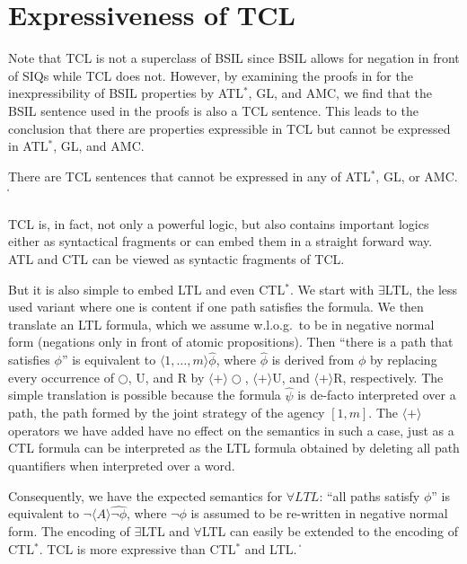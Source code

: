 \documentclass{llncs}
\newcommand{\until}{\textrm{U}} %
\newcommand{\rmrel}{\textrm{R}} %
\newcommand{\nxt}{\bigcirc}
\def\qed{\ifmmode\|\else{\unskip\nobreak\hfil
\penalty50\hskip1em\null\nobreak\hfil$\blacksquare$
\parfillskip=0pt\finalhyphendemerits=0\endgraf}\fi}
\begin{document}
\section{Expressiveness of TCL \label{sec.exp}}

Note that TCL is not a superclass of BSIL since 
BSIL allows for negation in front of SIQs while TCL does not. 
However, by examining the proofs in \cite{WHY11} 
for the inexpressibility of BSIL properties by ATL$^*$, GL, and AMC, 
we find that the BSIL sentence used in the proofs is also a TCL sentence. 
This leads to the conclusion that 
there are properties expressible in TCL but cannot 
be expressed in ATL$^*$, GL, and AMC.  

{\lemma \label{lemma.express.incomp1} 
There are TCL sentences that cannot be expressed 
in any of ATL$^*$, GL, or AMC.  
} 
\qed 


TCL is, in fact, not only a powerful logic, 
but also contains important logics either as syntactical fragments or can embed them in a straight forward way.
ATL and CTL can be viewed as syntactic fragments of TCL.

But it is also simple to embed LTL and even CTL$^*$.
We start with $\exists$LTL, the less used variant 
where one is content if one path satisfies the formula.
We then translate an LTL formula, which we assume w.l.o.g.\ 
to be in negative normal form 
(negations only in front of atomic propositions).
Then ``there is a path that satisfies $\phi$'' is equivalent to
$\langle 1,\ldots,m \rangle \widehat{\phi}$, where $\widehat{\phi}$ is derived from $\phi$ by replacing every occurrence of $\nxt$, $\until$, and $\rmrel$ by
$\langle + \rangle \nxt$, $\langle + \rangle \until$, and $\langle + \rangle \rmrel$, respectively.
%
The simple translation is possible because the formula $\widehat{\psi}$ 
is de-facto interpreted over a path, 
the path formed by the joint strategy of the agency $[1,m]$.
The $\langle + \rangle$ operators we have added have no effect on the semantics in such a case, just as a CTL formula can be interpreted as the LTL formula obtained by deleting all path quantifiers when interpreted over a word.

Consequently, we have the expected semantics for $\forall LTL$:  ``all paths satisfy $\phi$'' is equivalent to
$\neg \langle A \rangle \widehat{\neg\phi}$, where $\neg \phi$ is assumed to be re-written in negative normal form.
% 
The encoding of $\exists$LTL and $\forall$LTL can easily be extended to the encoding of CTL$^*$.  
%
{\lemma \label{lemma.express.ctl.star}
TCL is more expressive than CTL$^*$ and LTL.  
}
\qed 
\end{document}
